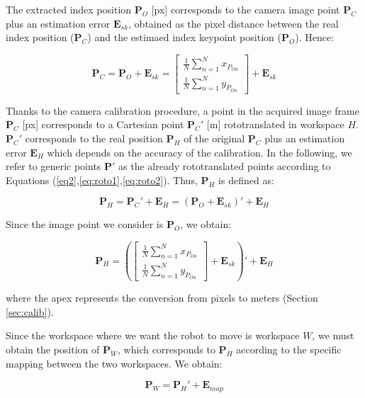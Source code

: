 \documentclass[letterpaper, 10 pt, conference]{ieeeconf}  %
\begin{document}
The extracted index position $\mathbf{P}_O$ [px] corresponds to the camera image point $\mathbf{P}_C$ plus an estimation error $\mathbf{E}_{sk}$, obtained as the pixel distance between the real index position ($\mathbf{P}_C$) and the estimaed index keypoint position ($\mathbf{P}_O$). Hence: 

\begin{equation}
\mathbf{P}_C = \mathbf{P}_O + \mathbf{E}_{sk} = \begin{bmatrix}
\frac{1}{N}\sum_{n=1}^{N}x_{P_{On}} \\
\frac{1}{N}\sum_{n=1}^{N}y_{P_{On}}
\end{bmatrix} + \mathbf{E}_{sk}
\end{equation}

Thanks to the camera calibration procedure, a point in the acquired image frame $\mathbf{P}_C$ [px] corresponds to a Cartesian point $\mathbf{P}_C'$ [m] rototranslated in workspace  $H$. $\mathbf{P}_C'$ corresponds to the real position $\mathbf{P}_H$ of the original $\mathbf{P}_C$ plus an estimation error $\mathbf{E}_H$ which depends on the accuracy of the calibration. In the following, we refer to generic points $\mathbf{P}'$ as the already rototranslated points according to Equations (\ref{eq2},\ref{eq:roto1},\ref{eq:roto2}). Thus, $\mathbf{P}_H$ is defined as:

\begin{equation}
\mathbf{P}_H = \mathbf{P}_C' + \mathbf{E}_H = (\mathbf{P}_O + \mathbf{E}_{sk})' + \mathbf{E}_H
\end{equation}

Since the image point we consider is $\mathbf{P}_O$, we obtain: 

\begin{equation}
\mathbf{P}_H = \left(\begin{bmatrix}
\frac{1}{N}\sum_{n=1}^{N}x_{P_{On}} \\
\frac{1}{N}\sum_{n=1}^{N}y_{P_{On}}
\end{bmatrix} + \mathbf{E}_{sk} \right)' + \mathbf{E}_H
\end{equation}

where the apex represents the conversion from pixels to meters (Section \ref{sec:calib}).

Since the workspace where we want the robot to move is workspace $W$, we must obtain the position of $\mathbf{P}_W$, which corresponds to $\mathbf{P}_H$ according to the specific mapping between the two workspaces. We obtain:

\begin{equation}
\mathbf{P}_W = \mathbf{P}_H' + \mathbf{E}_{map}
\end{equation}
\end{document}
